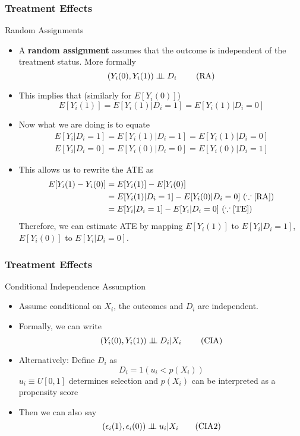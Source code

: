 \documentclass{beamer}
\begin{document}
\begin{frame}
\frametitle{Treatment Effects}
Random Assignments
\begin{itemize}
\item  A \textbf{random assignment} assumes that the outcome is independent of the treatment status. More formally
\[
(Y_i(0), Y_i(1))\perp \!\!\! \perp D_i \ \tag{\text{RA}}\label{RA}
\]
\item This implies that (similarly for $E[Y_i(0)]$)
\[
E[Y_i(1)]=E[Y_i(1)|D_i=1]=E[Y_i(1)|D_i=0]
\]
\item Now what we are doing is to equate
\footnotesize{\begin{gather*}
E[Y_i|D_i=1]=E[Y_i(1)|D_i=1]=E[Y_i(1)|D_i=0]\\
 E[Y_i|D_i=0]=E[Y_i(0)|D_i=0]=E[Y_i(0)|D_i=1]
\end{gather*}}\normalsize
\item This allows us to rewrite the ATE as 
\footnotesize{\begin{align*}
E[Y_i(1)-Y_i(0)]&=E[Y_i(1)]-E[Y_i(0)]\\
&=E[Y_i(1)|D_i=1]-E[Y_i(0)|D_i=0] \ (\because \ref{RA})\\
&=E[Y_i|D_i=1]-E[Y_i|D_i=0] \ (\because \ref{TE})
\end{align*}}\normalsize
Therefore, we can estimate ATE by mapping $E[Y_i(1)]$ to $E[Y_i|D_i=1]$, $E[Y_i(0)]$ to $E[Y_i|D_i=0]$. 
\end{itemize}
\end{frame}

\begin{frame}
\frametitle{Treatment Effects}
Conditional Independence Assumption
\begin{itemize}
\item Assume conditional on $X_i$, the outcomes and $D_i$ are independent.
\item Formally, we can write
\[
 (Y_i(0), Y_i(1))\perp \!\!\! \perp D_i|X_i \ \tag{\text{CIA}}\label{CIA}
\]
\item Alternatively: Define $D_i$ as
\[
D_i = 1(u_i<p(X_i))
\]
$u_i\equiv U[0,1]$ determines selection and $p(X_i)$ can be interpreted as a propensity score
\item Then we can also say
\[
(\epsilon_i(1), \epsilon_i(0))\perp \!\!\! \perp u_i|X_i \tag{\text{CIA2}}\label{CIA2}
\]
\end{itemize}
\end{frame}
\end{document}

